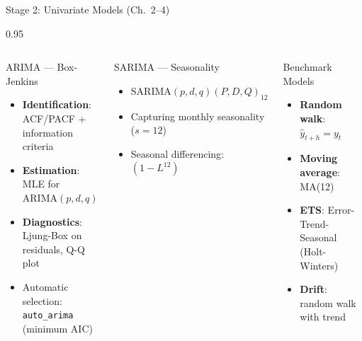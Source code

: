 \documentclass[9pt, aspectratio=169, t]{beamer}
\begin{document}
\begin{frame}{Stage 2: Univariate Models (Ch.\ 2--4)}
    \begin{cminipage}{0.95\textwidth}
        {\footnotesize
        \begin{columns}[T]
            \begin{block}{ARIMA --- Box-Jenkins}
                \begin{itemize}\setlength{\itemsep}{0pt}
                    \item \textbf{Identification}: ACF/PACF + information criteria
                    \item \textbf{Estimation}: MLE for $\text{ARIMA}(p,d,q)$
                    \item \textbf{Diagnostics}: Ljung-Box on residuals, Q-Q plot
                    \item Automatic selection: \texttt{auto\_arima} (minimum AIC)
                \end{itemize}
            \end{block}

            \vspace{0.15cm}

            \begin{exampleblock}{SARIMA --- Seasonality}
                \begin{itemize}\setlength{\itemsep}{0pt}
                    \item $\text{SARIMA}(p,d,q)(P,D,Q)_{12}$
                    \item Capturing monthly seasonality ($s=12$)
                    \item Seasonal differencing: $(1-L^{12})$
                \end{itemize}
            \end{exampleblock}

            \begin{alertblock}{Benchmark Models}
                \begin{itemize}\setlength{\itemsep}{0pt}
                    \item \textbf{Random walk}: $\hat{y}_{t+h} = y_t$
                    \item \textbf{Moving average}: MA(12)
                    \item \textbf{ETS}: Error-Trend-Seasonal (Holt-Winters)
                    \item \textbf{Drift}: random walk with trend
                \end{itemize}
            \end{alertblock}


\end{columns}}
\end{cminipage}
\end{frame}
\end{document}
